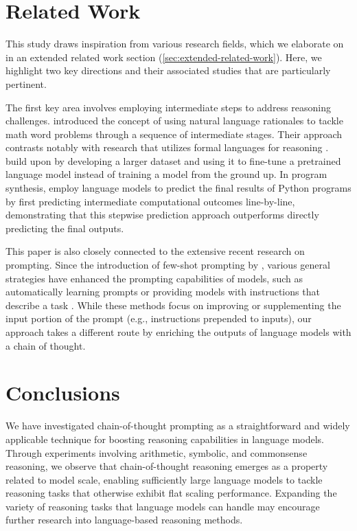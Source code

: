 \section{Related Work} This study draws inspiration from various research fields, which we elaborate on in an extended related work section (\cref{sec:extended-related-work}). Here, we highlight two key directions and their associated studies that are particularly pertinent.

The first key area involves employing intermediate steps to address reasoning challenges. \cite{ling-etal-2017-program} introduced the concept of using natural language rationales to tackle math word problems through a sequence of intermediate stages. Their approach contrasts notably with research that utilizes formal languages for reasoning \citep{roy-2016-reasoning, chiang-chen-2019-semantically, amini-etal-2019-mathqa, chen2019neural}. \citet{cobbe2021training} build upon \citet{ling-etal-2017-program} by developing a larger dataset and using it to fine-tune a pretrained language model instead of training a model from the ground up. In program synthesis, \cite{nye2021show} employ language models to predict the final results of Python programs by first predicting intermediate computational outcomes line-by-line, demonstrating that this stepwise prediction approach outperforms directly predicting the final outputs.

This paper is also closely connected to the extensive recent research on prompting. Since the introduction of few-shot prompting by \citet{brown2020language}, various general strategies have enhanced the prompting capabilities of models, such as automatically learning prompts \citep{lester-etal-2021-power} or providing models with instructions that describe a task \citep{wei2021finetuned,sanh2021multitask,ouyang2022training}. While these methods focus on improving or supplementing the input portion of the prompt (e.g., instructions prepended to inputs), our approach takes a different route by enriching the outputs of language models with a chain of thought.

\section{Conclusions} We have investigated chain-of-thought prompting as a straightforward and widely applicable technique for boosting reasoning capabilities in language models. Through experiments involving arithmetic, symbolic, and commonsense reasoning, we observe that chain-of-thought reasoning emerges as a property related to model scale, enabling sufficiently large language models to tackle reasoning tasks that otherwise exhibit flat scaling performance. Expanding the variety of reasoning tasks that language models can handle may encourage further research into language-based reasoning methods.

